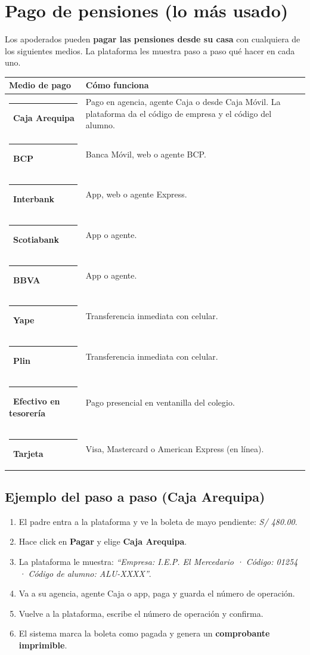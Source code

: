 \documentclass[11pt,a4paper]{article}
\begin{document}
\section{Pago de pensiones (lo más usado)}

Los apoderados pueden \textbf{pagar las pensiones desde su casa} con cualquiera de los siguientes medios. La plataforma les muestra paso a paso qué hacer en cada uno.

\begin{tabularx}{\textwidth}{@{}p{4cm}X@{}}
\toprule
\textbf{Medio de pago} & \textbf{Cómo funciona} \\
\midrule
{\color[HTML]{E12027}\rule{0.6cm}{8pt}}~\textbf{Caja Arequipa} & Pago en agencia, agente Caja o desde Caja Móvil. La plataforma da el código de empresa y el código del alumno. \\
\addlinespace
{\color[HTML]{002A5C}\rule{0.6cm}{8pt}}~\textbf{BCP} & Banca Móvil, web o agente BCP. \\
\addlinespace
{\color[HTML]{00A859}\rule{0.6cm}{8pt}}~\textbf{Interbank} & App, web o agente Express. \\
\addlinespace
{\color[HTML]{EE3424}\rule{0.6cm}{8pt}}~\textbf{Scotiabank} & App o agente. \\
\addlinespace
{\color[HTML]{004481}\rule{0.6cm}{8pt}}~\textbf{BBVA} & App o agente. \\
\addlinespace
{\color[HTML]{742282}\rule{0.6cm}{8pt}}~\textbf{Yape} & Transferencia inmediata con celular. \\
\addlinespace
{\color[HTML]{00B0AC}\rule{0.6cm}{8pt}}~\textbf{Plin} & Transferencia inmediata con celular. \\
\addlinespace
{\color[HTML]{1B8A4A}\rule{0.6cm}{8pt}}~\textbf{Efectivo en tesorería} & Pago presencial en ventanilla del colegio. \\
\addlinespace
{\color[HTML]{1E293B}\rule{0.6cm}{8pt}}~\textbf{Tarjeta} & Visa, Mastercard o American Express (en línea). \\
\bottomrule
\end{tabularx}

\subsection*{\textcolor{merBlue}{Ejemplo del paso a paso (Caja Arequipa)}}
\begin{enumerate}
\item El padre entra a la plataforma y ve la boleta de mayo pendiente: \textit{S/ 480.00}.
\item Hace click en \textbf{Pagar} y elige \textbf{Caja Arequipa}.
\item La plataforma le muestra: \textit{``Empresa: I.E.P. El Mercedario · Código: 01254 · Código de alumno: ALU-XXXX''}.
\item Va a su agencia, agente Caja o app, paga y guarda el número de operación.
\item Vuelve a la plataforma, escribe el número de operación y confirma.
\item El sistema marca la boleta como pagada y genera un \textbf{comprobante imprimible}.
\end{enumerate}
\end{document}
